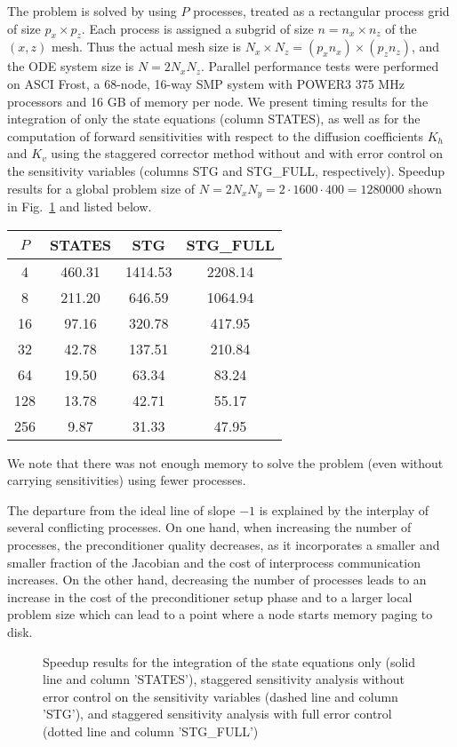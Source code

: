 The problem is solved by {\cvodes} using $P$ processes, treated as a 
rectangular process grid of size $p_x \times p_z$.
Each process is assigned a subgrid of size $n = n_x \times n_z$ of the 
$(x,z)$ mesh.  Thus the actual mesh size is 
$N_x \times N_z = (p_x n_x) \times (p_z n_z)$,
and the ODE system size is $N = 2 N_x N_z$.
Parallel performance tests were performed on ASCI Frost, a 68-node, 16-way SMP system
with POWER3 375 MHz processors and 16 GB of memory per node.
We present timing results for the integration of only the state equations
(column STATES), as well as for
the computation of forward sensitivities with respect to the diffusion coefficients
$K_h$ and $K_v$ using the staggered corrector method without and with 
error control on the sensitivity variables (columns STG and
STG\_FULL, respectively). 
Speedup results for a global problem size of
$N = 2 N_x N_y = 2 \cdot 1600 \cdot 400 = 1280000$ 
shown in Fig.~\ref{f:pvfktTest} and listed below.

\begin{center}
  \begin{tabular}{cccc}\hline
    $P$ &  STATES  &   STG   & STG\_FULL \\ \hline
    4  &  460.31  &  1414.53  & 2208.14  \\
    8  &  211.20  &   646.59  & 1064.94  \\
    16  &   97.16  &   320.78  &  417.95  \\
    32  &   42.78  &   137.51  &  210.84  \\
    64  &   19.50  &    63.34  &   83.24  \\
    128  &   13.78  &    42.71  &   55.17  \\
    256  &    9.87  &    31.33  &   47.95  \\ \hline
  \end{tabular}
\end{center}

We note that there was not enough memory to solve the problem (even without
carrying sensitivities) using fewer processes.

The departure from the ideal line of slope $-1$ is explained by the 
interplay of several conflicting processes. On one hand, when increasing the 
number of processes, the preconditioner quality decreases, as it incorporates 
a smaller and smaller fraction of the Jacobian and the cost of interprocess 
communication increases. On the other hand, decreasing the number of processes
leads to an increase in the cost of the preconditioner setup phase and to a larger
local problem size which can lead to a point where a node starts memory paging to disk.
\begin{figure}
  {\centerline{}}
  \caption[Speedup results on a sensitivity problem]
  {Speedup results for the integration of the state equations only
    (solid line and column 'STATES'), staggered sensitivity analysis without
    error control on the sensitivity variables (dashed line and column 'STG'),
    and staggered sensitivity analysis with full error control (dotted line and
    column 'STG\_FULL')}
  \label{f:pvfktTest}
\end{figure}

